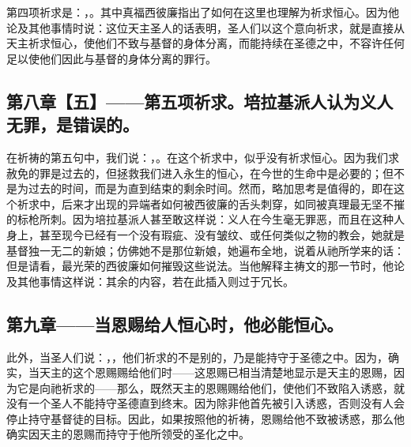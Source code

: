 第四项祈求是：，。其中真福西彼廉指出了如何在这里也理解为祈求恒心。因为他论及其他事情时说：这位天主圣人的话表明，圣人们以这个意向祈求，就是直接从天主祈求恒心，使他们不致与基督的身体分离，而能持续在圣德之中，不容许任何足以使他们因此与基督的身体分离的罪行。\par


\subsection{第八章【五】——第五项祈求。培拉基派人认为义人无罪，是错误的。}

在祈祷的第五句中，我们说：，。在这个祈求中，似乎没有祈求恒心。因为我们求赦免的罪是过去的，但拯救我们进入永生的恒心，在今世的生命中是必要的；但不是为过去的时间，而是为直到结束的剩余时间。然而，略加思考是值得的，即在这个祈求中，后来才出现的异端者如何被西彼廉的舌头刺穿，如同被真理最无坚不摧的标枪所刺。因为培拉基派人甚至敢这样说：义人在今生毫无罪恶，而且在这种人身上，甚至现今已经有一个没有瑕疵、没有皱纹、或任何类似之物的教会，她就是基督独一无二的新娘；仿佛她不是那位新娘，她遍布全地，说着从祂所学来的话：但是请看，最光荣的西彼廉如何摧毁这些说法。当他解释主祷文的那一节时，他论及其他事情这样说：其余的内容，若在此插入则过于冗长。\par


\subsection{第九章——当恩赐给人恒心时，他必能恒心。}

此外，当圣人们说：，，他们祈求的不是别的，乃是能持守于圣德之中。因为，确实，当天主的这个恩赐赐给他们时——这恩赐已相当清楚地显示是天主的恩赐，因为它是向祂祈求的——那么，既然天主的恩赐赐给他们，使他们不致陷入诱惑，就没有一个圣人不能持守圣德直到终末。因为除非他首先被引入诱惑，否则没有人会停止持守基督徒的目标。因此，如果按照他的祈祷，恩赐给他不致被诱惑，那么他确实因天主的恩赐而持守于他所领受的圣化之中。\par

